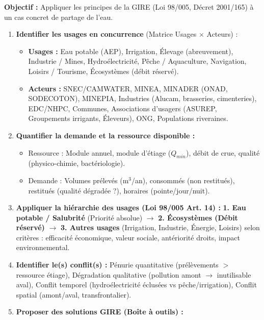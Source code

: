 \documentclass[11pt]{article}
\begin{document}
\begin{methode}
    \textbf{Objectif :} Appliquer les principes de la GIRE (Loi 98/005, Décret 2001/165) à un cas concret de partage de l'eau.
    \begin{enumerate}
        \item \textbf{Identifier les usages en concurrence} (Matrice Usages $\times$ Acteurs) :
        \begin{itemize}
            \item \textbf{Usages :} Eau potable (AEP), Irrigation, Élevage (abreuvement), Industrie / Mines, Hydroélectricité, Pêche / Aquaculture, Navigation, Loisirs / Tourisme, Écosystèmes (débit réservé).
            \item \textbf{Acteurs :} SNEC/CAMWATER, MINEA, MINADER (ONAD, SODECOTON), MINEPIA, Industries (Alucam, brasseries, cimenteries), EDC/NHPC, Communes, Associations d'usagers (ASUREP, Groupements irrigants, Éleveurs), ONG, Populations riveraines.
        \end{itemize}
        \item \textbf{Quantifier la demande et la ressource disponible :}
        \begin{itemize}
            \item Ressource : Module annuel, module d'étiage ($Q_{min}$), débit de crue, qualité (physico-chimie, bactériologie).
            \item Demande : Volumes prélevés (m$^3$/an), consommés (non restitués), restitués (qualité dégradée ?), horaires (pointe/jour/nuit).
        \end{itemize}
        \item \textbf{Appliquer la hiérarchie des usages (Loi 98/005 Art. 14) :}
        \textbf{1. Eau potable / Salubrité} (Priorité absolue) $\rightarrow$ \textbf{2. Écosystèmes (Débit réservé)} $\rightarrow$ \textbf{3. Autres usages} (Irrigation, Industrie, Énergie, Loisirs) selon critères : efficacité économique, valeur sociale, antériorité droits, impact environnemental.
        \item \textbf{Identifier le(s) conflit(s) :} Pénurie quantitative (prélèvements $>$ ressource étiage), Dégradation qualitative (pollution amont $\rightarrow$ inutilisable aval), Conflit temporel (hydroélectricité éclusées vs pêche/irrigation), Conflit spatial (amont/aval, transfrontalier).
        \item \textbf{Proposer des solutions GIRE (Boîte à outils) :}
        \begin{itemize}

\end{itemize}
\end{enumerate}
\end{methode}
\end{document}
